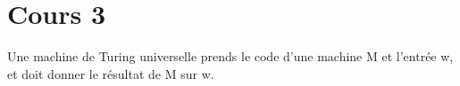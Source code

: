 \section{Cours 3}
Une machine de Turing universelle prends le code d'une machine M et l'entrée w, et doit donner le résultat de M sur w.
